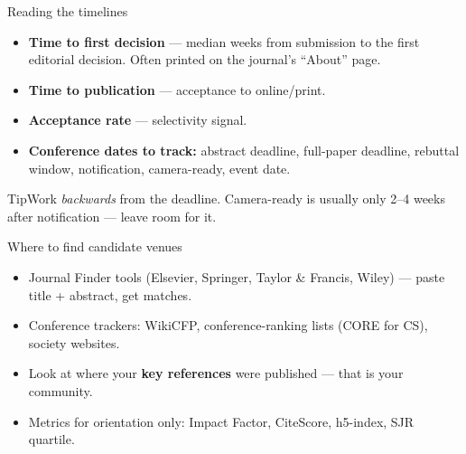 \documentclass[aspectratio=169,11pt]{beamer}
\newcommand{\tipbox}[1]{\begin{block}{Tip}#1\end{block}}
\begin{document}

\begin{frame}{Reading the timelines}
  \begin{itemize}
    \item \textbf{Time to first decision} --- median weeks from submission to the first editorial decision. Often printed on the journal's ``About'' page.
    \item \textbf{Time to publication} --- acceptance to online/print.
    \item \textbf{Acceptance rate} --- selectivity signal.
    \item \textbf{Conference dates to track:} abstract deadline, full-paper deadline, rebuttal window, notification, camera-ready, event date.
  \end{itemize}
  \tipbox{Work \emph{backwards} from the deadline. Camera-ready is usually only 2--4 weeks after notification --- leave room for it.}
\end{frame}

\begin{frame}{Where to find candidate venues}
  \begin{itemize}
    \item Journal Finder tools (Elsevier, Springer, Taylor \& Francis, Wiley) --- paste title + abstract, get matches.
    \item Conference trackers: WikiCFP, conference-ranking lists (CORE for CS), society websites.
    \item Look at where your \textbf{key references} were published --- that is your community.
    \item Metrics for orientation only: Impact Factor, CiteScore, h5-index, SJR quartile.
  \end{itemize}
\end{frame}
\end{document}
